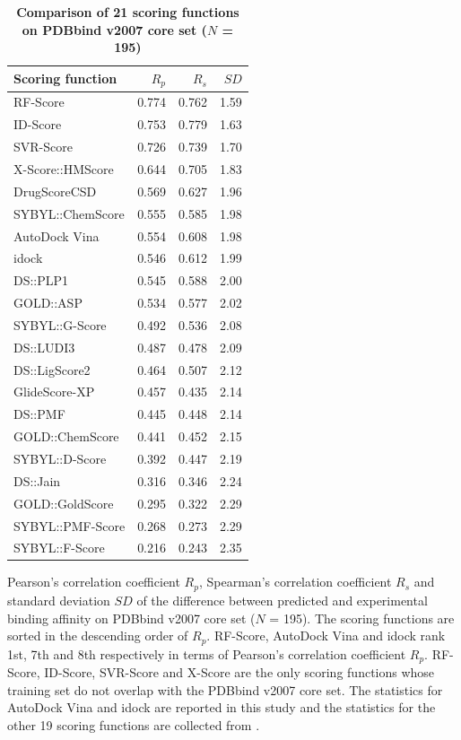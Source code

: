 \documentclass[10pt]{article}
\begin{document}
\begin{table}[!ht]
\caption{
\bf{Comparison of 21 scoring functions on PDBbind v2007 core set ($N$ = 195)}}
\begin{tabular}{lrrr}
\hline
Scoring function & $R_p$ & $R_s$ & $SD$\\
\hline
RF-Score & 0.774 & 0.762 & 1.59\\
ID-Score & 0.753 & 0.779 & 1.63\\
SVR-Score & 0.726 & 0.739 & 1.70\\
X-Score::HMScore & 0.644 & 0.705 & 1.83\\
DrugScoreCSD & 0.569 & 0.627 & 1.96\\
SYBYL::ChemScore & 0.555 & 0.585 & 1.98\\
AutoDock Vina & 0.554 & 0.608 & 1.98\\
idock & 0.546 & 0.612 & 1.99\\
DS::PLP1 & 0.545 & 0.588 & 2.00\\
GOLD::ASP & 0.534 & 0.577 & 2.02\\
SYBYL::G-Score & 0.492 & 0.536 & 2.08\\
DS::LUDI3 & 0.487 & 0.478 & 2.09\\
DS::LigScore2 & 0.464 & 0.507 & 2.12\\
GlideScore-XP & 0.457 & 0.435 & 2.14\\
DS::PMF & 0.445 & 0.448 & 2.14\\
GOLD::ChemScore & 0.441 & 0.452 & 2.15\\
SYBYL::D-Score & 0.392 & 0.447 & 2.19\\
DS::Jain & 0.316 & 0.346 & 2.24\\
GOLD::GoldScore & 0.295 & 0.322 & 2.29\\
SYBYL::PMF-Score & 0.268 & 0.273 & 2.29\\
SYBYL::F-Score & 0.216 & 0.243 & 2.35\\
\end{tabular}
\begin{flushleft}\label{ScoringFunctionComparison} Pearson's correlation coefficient $R_p$, Spearman's correlation coefficient $R_s$ and standard deviation $SD$ of the difference between predicted and experimental binding affinity on PDBbind v2007 core set ($N$ = 195). The scoring functions are sorted in the descending order of $R_p$. RF-Score, AutoDock Vina and idock rank 1st, 7th and 8th respectively in terms of Pearson's correlation coefficient $R_p$. RF-Score, ID-Score, SVR-Score and X-Score are the only scoring functions whose training set do not overlap with the PDBbind v2007 core set. The statistics for AutoDock Vina and idock are reported in this study and the statistics for the other 19 scoring functions are collected from \cite{1313,564,1305,1295}.
\end{flushleft}
\end{table}
\end{document}
